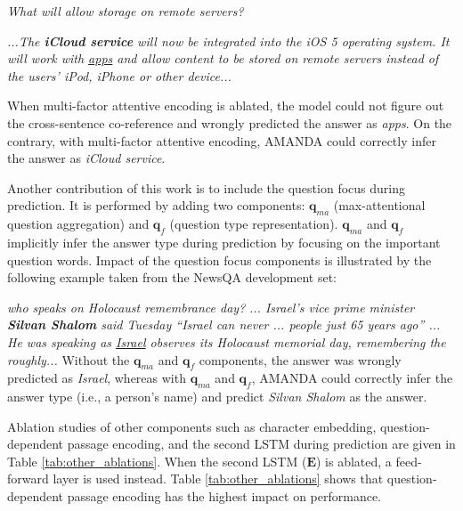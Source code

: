 \documentclass[letterpaper]{article} %
\begin{document}
\noindent
\textit{
What will allow storage on remote servers?
}

\noindent
\textit{
...The \textbf{iCloud service} will now be integrated into the iOS 5 operating system. It will work with \underline{apps} and allow content to be stored on remote servers instead of the users' iPod, iPhone or other device...
}

\noindent
When multi-factor attentive encoding is ablated, the model could not figure out the cross-sentence co-reference and wrongly predicted the answer as {\em apps}. On the contrary, with multi-factor attentive encoding, AMANDA could correctly infer the answer as {\em iCloud service}.

Another contribution of this work is to include the question focus during prediction. It is performed by adding two components: $\mathbf{q}_{ma}$ (max-attentional question aggregation) and $\mathbf{q}_f$ (question type representation). $\mathbf{q}_{ma}$ and $\mathbf{q}_f$ implicitly infer the answer type during prediction by focusing on the important question words.
Impact of the question focus components is illustrated by the following example taken from the NewsQA development set:

\noindent
\textit{
who speaks on Holocaust remembrance day?
}
\newline
\textit{
... Israel's vice prime minister \textbf{Silvan Shalom} said Tuesday ``Israel can never ... people just 65 years ago'' ... He was speaking as \underline{Israel} observes its Holocaust memorial day, remembering the roughly...
} \newline
Without the $\mathbf{q}_{ma}$ and $\mathbf{q}_f$ components, the answer was wrongly predicted as {\em Israel}, whereas with $\mathbf{q}_{ma}$ and $\mathbf{q}_{f}$, AMANDA could correctly infer the answer type (i.e., a person's name) and predict {\em Silvan Shalom} as the answer.

Ablation studies of other components such as character embedding, question-dependent passage encoding, and the second LSTM during prediction are given in Table \ref{tab:other_ablations}. When the second LSTM ($\mathbf{E}$) is ablated, a feed-forward layer is used instead. Table \ref{tab:other_ablations} shows that question-dependent passage encoding has the highest impact on performance.
\end{document}
